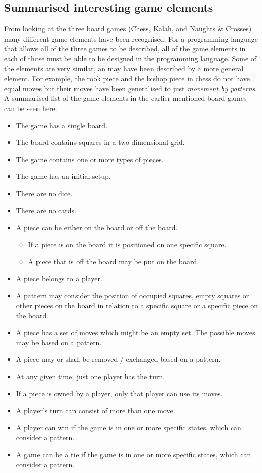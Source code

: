 \subsection{Summarised interesting game elements}
\label{subsec:differences}
From looking at the three board games (Chess, Kalah, and Naughts \& Crosses) many different game elements have been recognised. For a programming language that allows all of the three games to be described, all of the game elements in each of those must be able to be designed in the programming language. Some of the elements are very similar, an may have been described by a more general element. For example, the rook piece and the bishop piece in chess do not have equal moves but their moves have been generalised to just \textit{movement by patterns}. A summarised list of the game elements in the earlier mentioned board games can be seen here:
\begin{itemize}[noitemsep]
  \item The game has a single board.
  \item The board contains squares in a two-dimensional grid.
  \item The game contains one or more types of pieces.
  \item The game has an initial setup.
  \item There are no dice.
  \item There are no cards.
  \item A piece can be either on the board or off the board. 
  \begin{itemize}[noitemsep]
  \item If a piece is on the board it is positioned on one specific square.
  \item A piece that is off the board may be put on the board.
  \end{itemize}
  \item A piece belongs to a player.
  \item A pattern may consider the position of occupied squares, empty squares or other pieces on the board in relation to a specific square or a specific piece on the board.
  \item A piece has a set of moves which might be an empty set. The possible moves may be based on a pattern.
  \item A piece may or shall be removed / exchanged based on a pattern.
  \item At any given time, just one player has the turn.
  \item If a piece is owned by a player, only that player can use its moves.
  \item A player's turn can consist of more than one move.
  \item A player can win if the game is in one or more specific states, which can consider a pattern.
  \item A game can be a tie if the game is in one or more specific states, which can consider a pattern.
\end{itemize}

